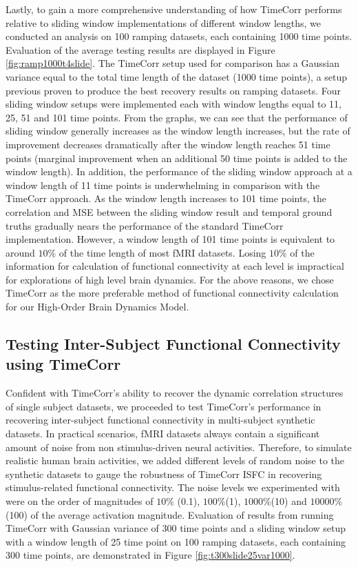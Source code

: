 \documentclass[11pt]{article}
\begin{document}
Lastly, to gain a more comprehensive understanding of how TimeCorr performs relative to sliding window implementations of different window lengths, we conducted an analysis on 100 ramping datasets, each containing 1000 time points. Evaluation of the average testing results are displayed in Figure \ref{fig:ramp1000t4slide}. The TimeCorr setup used for comparison has a Gaussian variance equal to the total time length of the dataset (1000 time points), a setup previous proven to produce the best recovery results on ramping datasets. Four sliding window setups were implemented each with window lengths equal to 11, 25, 51 and 101 time points. From the graphs, we can see that the performance of sliding window generally increases as the window length increases, but the rate of improvement decreases dramatically after the window length reaches 51 time points (marginal improvement when an additional 50 time points is added to the window length). In addition, the performance of the sliding window approach at a window length of 11 time points is underwhelming in comparison with the TimeCorr approach. As the window length increases to 101 time points, the correlation and MSE between the sliding window result and temporal ground truths gradually nears the performance of the standard TimeCorr implementation. However, a window length of 101 time points is equivalent to around $10\%$ of the time length of most fMRI datasets. Losing $10\%$ of the information for calculation of functional connectivity at each level is impractical for explorations of high level brain dynamics. For the above reasons, we chose TimeCorr as the more preferable method of functional connectivity calculation for our High-Order Brain Dynamics Model.


\subsection{Testing Inter-Subject Functional Connectivity using TimeCorr}
Confident with TimeCorr's ability to recover the dynamic correlation structures of single subject datasets, we proceeded to test TimeCorr's performance in recovering inter-subject functional connectivity in multi-subject synthetic datasets. In practical scenarios, fMRI datasets always contain a significant amount of noise from non stimulus-driven neural activities. Therefore, to simulate realistic human brain activities, we added different levels of random noise to the synthetic datasets to gauge the robustness of TimeCorr ISFC in recovering stimulus-related functional connectivity. The noise levels we experimented with were on the order of magnitudes of $10\%$ (0.1), $100\%$(1), $1000\%$(10) and $10000\%$(100) of the average activation magnitude. Evaluation of results from running TimeCorr with Gaussian variance of 300 time points and a sliding window setup with a window length of 25 time point on 100 ramping datasets, each containing 300 time points, are demonstrated in Figure \ref{fig:t300slide25var1000}.
\end{document}
